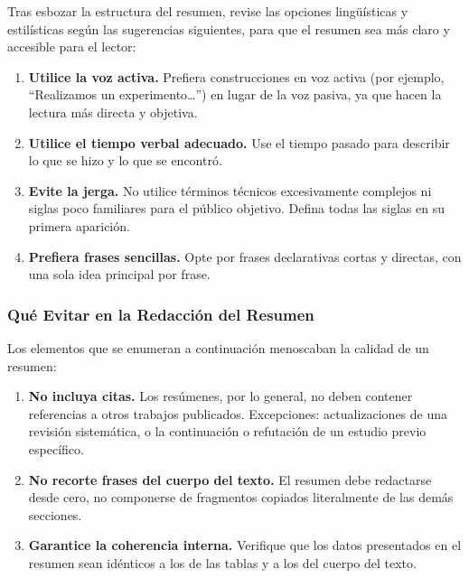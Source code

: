 \documentclass[spanish]{rbie2026}%
\begin{document}
Tras esbozar la estructura del resumen, revise las opciones lingüísticas y estilísticas según las sugerencias siguientes, para que el resumen sea más claro y accesible para el lector:

\begin{enumerate}
  \item \textbf{Utilice la voz activa.} Prefiera construcciones en voz activa (por ejemplo, ``Realizamos un experimento\ldots'') en lugar de la voz pasiva, ya que hacen la lectura más directa y objetiva.

  \item \textbf{Utilice el tiempo verbal adecuado.} Use el tiempo pasado para describir lo que se hizo y lo que se encontró.

  \item \textbf{Evite la jerga.} No utilice términos técnicos excesivamente complejos ni siglas poco familiares para el público objetivo. Defina todas las siglas en su primera aparición.

  \item \textbf{Prefiera frases sencillas.} Opte por frases declarativas cortas y directas, con una sola idea principal por frase.
\end{enumerate}


\subsubsection{Qué Evitar en la Redacción del Resumen}

Los elementos que se enumeran a continuación menoscaban la calidad de un resumen:

\begin{enumerate}
  \item \textbf{No incluya citas.} Los resúmenes, por lo general, no deben contener referencias a otros trabajos publicados. Excepciones: actualizaciones de una revisión sistemática, o la continuación o refutación de un estudio previo específico.

  \item \textbf{No recorte frases del cuerpo del texto.} El resumen debe redactarse desde cero, no componerse de fragmentos copiados literalmente de las demás secciones.

  \item \textbf{Garantice la coherencia interna.} Verifique que los datos presentados en el resumen sean idénticos a los de las tablas y a los del cuerpo del texto.
\end{enumerate}
\end{document}
